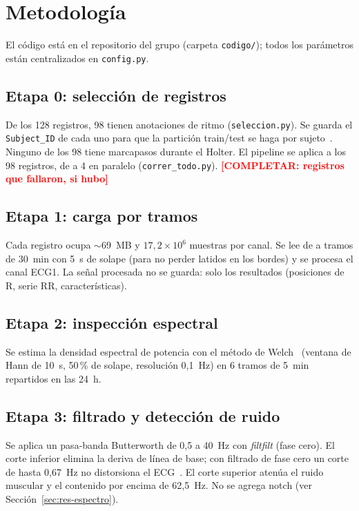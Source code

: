 \documentclass[11pt,a4paper]{article}
\newcommand{\completar}[1]{\textcolor{red}{\textbf{[COMPLETAR: #1]}}}
\begin{document}
\section{Metodología}
El código está en el repositorio del grupo (carpeta \texttt{codigo/}); todos los parámetros están centralizados en \texttt{config.py}.

\subsection{Etapa 0: selección de registros}
De los 128 registros, 98 tienen anotaciones de ritmo (\texttt{seleccion.py}). Se guarda el \texttt{Subject\_ID} de cada uno para que la partición train/test se haga por sujeto~\cite{dechazal2004}. Ninguno de los 98 tiene marcapasos durante el Holter. El pipeline se aplica a los 98 registros, de a 4 en paralelo (\texttt{correr\_todo.py}). \completar{registros que fallaron, si hubo}

\subsection{Etapa 1: carga por tramos}
Cada registro ocupa $\sim$69~MB y $17{,}2\times10^6$ muestras por canal. Se lee de a tramos de 30~min con 5~s de solape (para no perder latidos en los bordes) y se procesa el canal ECG1. La señal procesada no se guarda: solo los resultados (posiciones de R, serie RR, características).

\subsection{Etapa 2: inspección espectral}
Se estima la densidad espectral de potencia con el método de Welch~\cite{welch1967} (ventana de Hann de 10~s, 50\,\% de solape, resolución 0,1~Hz) en 6 tramos de 5~min repartidos en las 24~h.

\subsection{Etapa 3: filtrado y detección de ruido}
Se aplica un pasa-banda Butterworth de 0,5 a 40~Hz con \textit{filtfilt} (fase cero). El corte inferior elimina la deriva de línea de base; con filtrado de fase cero un corte de hasta 0,67~Hz no distorsiona el ECG~\cite{kligfield2007}. El corte superior atenúa el ruido muscular y el contenido por encima de 62,5~Hz. No se agrega notch (ver Sección~\ref{sec:res-espectro}).
\end{document}
